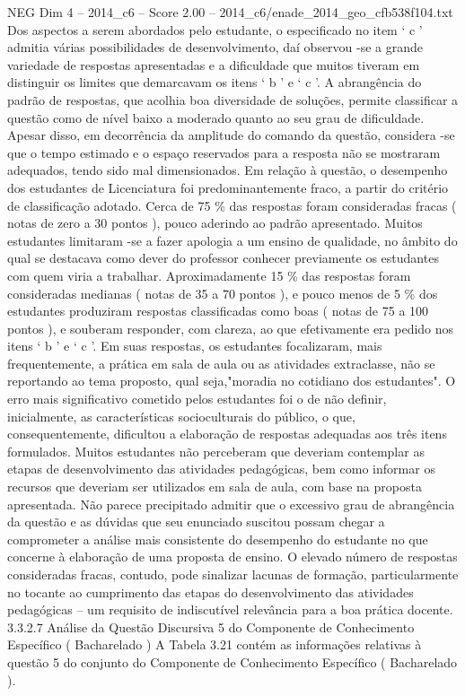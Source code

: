 \begin{textsample}{NEG Dim 4 – 2014\_c6 – Score 2.00 – 2014\_c6/enade\_2014\_geo\_cfb538f104.txt}
Dos aspectos a serem abordados pelo estudante, o especificado no item ‘ c ’ admitia várias possibilidades de desenvolvimento, daí observou -se a grande variedade de respostas apresentadas e a dificuldade que muitos tiveram em distinguir os limites que demarcavam os itens ‘ b ’ e ‘ c ’.
A abrangência do padrão de respostas, que acolhia boa diversidade de soluções, permite classificar a questão como de nível baixo a moderado quanto ao seu grau de dificuldade.
Apesar disso, em decorrência da amplitude do comando da questão, considera -se que o tempo estimado e o espaço reservados para a resposta não se mostraram adequados, tendo sido mal dimensionados.
Em relação à questão, o desempenho dos estudantes de Licenciatura foi predominantemente fraco, a partir do critério de classificação adotado.
Cerca de 75 \% das respostas foram consideradas fracas ( notas de zero a 30 pontos ), pouco aderindo ao padrão apresentado.
Muitos estudantes limitaram -se a fazer apologia a um ensino de qualidade, no âmbito do qual se destacava como dever do professor conhecer previamente os estudantes com quem viria a trabalhar.
Aproximadamente 15 \% das respostas foram consideradas medianas ( notas de 35 a 70 pontos ), e pouco menos de 5 \% dos estudantes produziram respostas classificadas como boas ( notas de 75 a 100 pontos ), e souberam responder, com clareza, ao que efetivamente era pedido nos itens ‘ b ’ e ‘ c ’.
Em suas respostas, os estudantes focalizaram, mais frequentemente, a prática em sala de aula ou as atividades extraclasse, não se reportando ao tema proposto, qual seja,"moradia no cotidiano dos estudantes".
O erro mais significativo cometido pelos estudantes foi o de não definir, inicialmente, as características socioculturais do público, o que, consequentemente, dificultou a elaboração de respostas adequadas aos três itens formulados.
Muitos estudantes não perceberam que deveriam contemplar as etapas de desenvolvimento das atividades pedagógicas, bem como informar os recursos que deveriam ser utilizados em sala de aula, com base na proposta apresentada.
Não parece precipitado admitir que o excessivo grau de abrangência da questão e as dúvidas que seu enunciado suscitou possam chegar a comprometer a análise mais consistente do desempenho do estudante no que concerne à elaboração de uma proposta de ensino.
O elevado número de respostas consideradas fracas, contudo, pode sinalizar lacunas de formação, particularmente no tocante ao cumprimento das etapas do desenvolvimento das atividades pedagógicas – um requisito de indiscutível relevância para a boa prática docente. 3.3.2.7 Análise da Questão Discursiva 5 do Componente de Conhecimento Específico ( Bacharelado ) A Tabela 3.21 contém as informações relativas à questão 5 do conjunto do Componente de Conhecimento Específico ( Bacharelado ).

\end{textsample}
